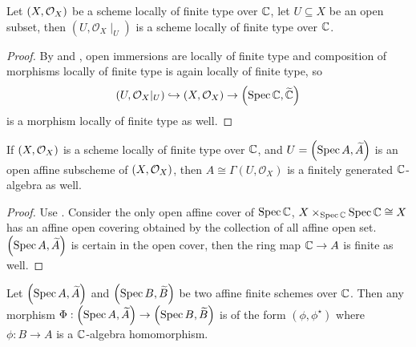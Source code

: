 
\begin{proposition}
  Let $\left(X, \mathcal{O}_{X}\right)$ be a scheme locally of finite type over $\mathbb{C}$, let $U \subseteq X$ be an open subset, then $(U, \mathcal{O}_{X}\mid_{U})$ is a scheme locally of finite type over $\mathbb{C}$.
  \label{thm:restriction-of-scheme-of-finite-type-is-scheme-of-finite-type}
\end{proposition}
\begin{proof}
  By  and , open immersions are locally of finite type and composition of morphisms locally of finite type is again locally of finite type, so
  \[
    \left(U, \mathcal{O}_{X}|_{U}\right) \hookrightarrow \left(X, \mathcal{O}_{X}\right) \to \left(\operatorname*{Spec}{\mathbb{C}}, \widetilde{\mathbb{C}}\right)
  \]
  is a morphism locally of finite type as well.
\end{proof}

\begin{proposition}
  If $\left(X, \mathcal{O}_{X}\right)$ is a scheme locally of finite type over $\mathbb{C}$, and $U = \left(\operatorname*{Spec}{A}, \widetilde{A}\right)$ is an open affine subscheme of $\left(X, \mathcal{O}_{X}\right)$, then $A \cong \Gamma(U, \mathcal{O}_{X})$ is a finitely generated $\mathbb{C}$-algebra as well.
\end{proposition}

\begin{proof}
  Use . Consider the only open affine cover of $\operatorname{Spec} \mathbb{C}$, $X \times_{\operatorname{Spec} \mathbb{C}} \operatorname{Spec} \mathbb{C} \cong X$ has an affine open covering obtained by the collection of all affine open set. $\left(\operatorname*{Spec}{A}, \widetilde{A}\right)$ is certain in the open cover, then the ring map $\mathbb{C} \to A$ is finite as well.
\end{proof}

\begin{proposition}
  Let $\left(\operatorname*{Spec}{A}, \widetilde{A}\right)$ and $\left(\operatorname*{Spec}{B}, \widetilde{B}\right)$ be two affine finite schemes over $\mathbb{C}$. Then any morphism $\Phi : \left(\operatorname*{Spec}{A}, \widetilde{A}\right) \to \left(\operatorname*{Spec}{B}, \widetilde{B}\right)$ is of the form $(\phi, \phi^{\star})$ where $\phi : B \to A$ is a $\mathbb{C}$-algebra homomorphism.
\end{proposition}

